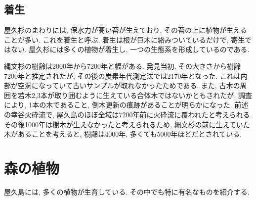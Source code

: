 \documentclass[10pt,titlepage,a5paper]{ltjsbook}
\begin{document}
  \subsection{着生}
    屋久杉のまわりには, 保水力が高い苔が生えており, その苔の上に植物が生えることが多い. これを着生と呼ぶ. 着生は根が巨木に絡みついているだけで, 寄生ではない. 屋久杉には多くの植物が着生し, 一つの生態系を形成しているのである.
  \vspace{1em}
  \begin{tcolorbox}[title=コラム:縄文杉は何歳?,width=\textwidth]
    縄文杉の樹齢は2000年から7200年と幅がある. 発見当初, その大きさから樹齢7200年と推定されたが, その後の炭素年代測定法では2170年となった. これは内部が空洞になっていて古いサンプルが取れなかったためである.
    また, 古木の周囲を若木2,3本が取り囲むように生えている合体木ではないかともされたが, 調査により, 1本の木であること, 倒木更新の痕跡があることが明らかになった. 前述の幸谷火砕流で, 屋久島のほぼ全域は7200年前に火砕流に覆われたと考えられる. その後1000年は樹木が生えなかったと考えられるため, 縄文杉の前に生えていた木があることを考えると, 樹齢は4000年, 多くても5000年ほどだとされている.
  \end{tcolorbox}
\section{森の植物}
  屋久島には, 多くの植物が生育している. その中でも特に有名なものを紹介する.
\end{document}
